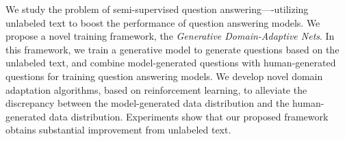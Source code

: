 We study the problem of semi-supervised question answering----utilizing unlabeled text to boost the performance of question answering models. We propose a novel training framework, the \textit{Generative Domain-Adaptive Nets}. In this framework, we train a generative model to generate questions based on the unlabeled text, and combine model-generated questions with human-generated questions for training question answering models. We develop novel domain adaptation algorithms, based on reinforcement learning, to alleviate the discrepancy between the model-generated data distribution and the human-generated data distribution. Experiments show that our proposed framework obtains substantial improvement from unlabeled text.
